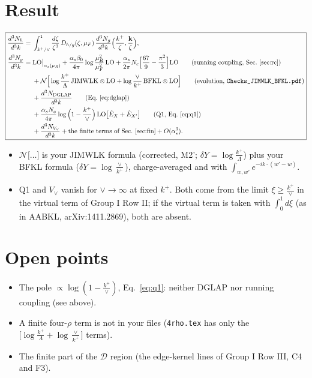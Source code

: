 \documentclass[10pt]{article}
\numberwithin{equation}{section}
\begin{document}
\section{Result}\label{sec:res}
\begin{equation}
\boxed{\begin{aligned}
\frac{d^3N_h}{d^3k}={}&\int_{k^+/\vee}^1\frac{d\zeta}{\zeta^3}\,D_{h/g}(\zeta,\mu_F)\,\frac{d^3N_g}{d^3k}\Big(\frac{k^+}{\zeta},\frac{\mathbf k}{\zeta}\Big),\\
\frac{d^3N_g}{d^3k}={}&{\rm LO}\big|_{\alpha_s(\mu_R)}+\frac{\alpha_s\beta_0}{4\pi}\log\frac{\mu_R^2}{\mu_F^2}\,{\rm LO}+\frac{\alpha_s}{2\pi}N_c\Big[\frac{67}{9}-\frac{\pi^2}{3}\Big]{\rm LO}\qquad\text{(running coupling, Sec.~\ref{sec:rc})}\\
&+\mathcal N\Big[\log\frac{k^+}{\Lambda}\,{\rm JIMWLK}\otimes{\rm LO}+\log\frac{\vee}{k^+}\,{\rm BFKL}\otimes{\rm LO}\Big]\qquad\text{(evolution, \texttt{Checks\_JIMWLK\_BFKL.pdf})}\\
&+\frac{d^3N_{\rm DGLAP}}{d^3k}\qquad\text{(Eq.~\eqref{eq:dglap})}\\
&+\frac{\alpha_sN_c}{4\pi}\log\Big(1-\frac{k^+}{\vee}\Big)\,{\rm LO}\big[\hat E_X+\hat E_{X'}\big]\qquad\text{(Q1, Eq.~\eqref{eq:q1})}\\
&+\frac{d^3N_{V_\vee}}{d^3k}+\text{the finite terms of Sec.~\ref{sec:fin}}+O(\alpha_s^3).
\end{aligned}}
\label{eq:result}
\end{equation}
\begin{itemize}
\item $\mathcal N\big[\dots\big]$ is your JIMWLK formula (corrected, M2'; $\delta Y=\log\frac{k^+}{\Lambda}$) plus your BFKL formula ($\delta Y=\log\frac{\vee}{k^+}$), charge-averaged and with $\int_{w,w'}e^{-ik\cdot(w'-w)}$.
\item Q1 and $V_\vee$ vanish for $\vee\to\infty$ at fixed $k^+$. Both come from the limit $\xi\ge\frac{k^+}{\vee}$ in the virtual term of Group I Row II; if the virtual term is taken with $\int_0^1d\xi$ (as in AABKL, arXiv:1411.2869), both are absent.
\end{itemize}

\section{Open points}\label{sec:open}
\begin{itemize}
\item[Q1] The pole $\propto\log(1-\frac{k^+}{\vee})$, Eq.~\eqref{eq:q1}: neither DGLAP nor running coupling (see above).
\item[Q2] A finite four-$\rho$ term is not in your files (\texttt{4rho.tex} has only the $\big[\log\frac{k^+}{\Lambda}+\log\frac{\vee}{k^+}\big]$ terms).
\item[Q3] The finite part of the $\mathcal D$ region (the edge-kernel lines of Group I Row III, C4 and F3).
\end{itemize}
\end{document}
